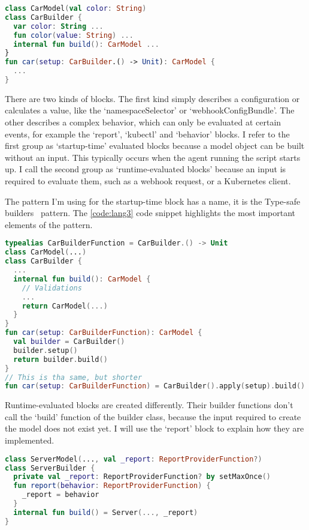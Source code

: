 \begin{minipage}{\linewidth}
\begin{lstlisting}[caption={Basic idea behind a block},language=Kotlin,label=code:lang2]
class CarModel(val color: String)
class CarBuilder {
  var color: String ...
  fun color(value: String) ...
  internal fun build(): CarModel ...
}
fun car(setup: CarBuilder.() -> Unit): CarModel {
  ...
}
\end{lstlisting}
\end{minipage}

There are two kinds of blocks. The first kind simply describes a configuration or calculates a value, like the `namespaceSelector' or `webhookConfigBundle'. The other describes a complex behavior, which can only be evaluated at certain events, for example the `report', `kubectl' and `behavior' blocks. I refer to the first group as `startup-time' evaluated blocks because a model object can be built without an input. This typically occurs when the agent running the script starts up. I call the second group as `runtime-evaluated blocks' because an input is required to evaluate them, such as a webhook request, or a Kubernetes client.

The pattern I'm using for the startup-time block has a name, it is the Type-safe builders~\cite{TypeSafeBuilders} pattern. The \ref{code:lang3} code snippet highlights the most important elements of the pattern.

\begin{minipage}{\linewidth}
\begin{lstlisting}[caption={Type-safe builders example},language=Kotlin,label=code:lang3]
typealias CarBuilderFunction = CarBuilder.() -> Unit
class CarModel(...)
class CarBuilder {
  ...
  internal fun build(): CarModel {
    // Validations
    ...
    return CarModel(...)
  }
}
fun car(setup: CarBuilderFunction): CarModel {
  val builder = CarBuilder()
  builder.setup()
  return builder.build()
}
// This is tha same, but shorter
fun car(setup: CarBuilderFunction) = CarBuilder().apply(setup).build()
\end{lstlisting}
\end{minipage}

Runtime-evaluated blocks are created differently. Their builder functions don't call the `build' function of the builder class, because the input required to create the model does not exist yet. I will use the `report' block to explain how they are implemented.

\begin{minipage}{\linewidth}
\begin{lstlisting}[caption={Builder function of the report block},language=Kotlin,label=code:runtimeblock0]
class ServerModel(..., val _report: ReportProviderFunction?)
class ServerBuilder {
  private val _report: ReportProviderFunction? by setMaxOnce()
  fun report(behavior: ReportProviderFunction) {
    _report = behavior
  }
  internal fun build() = Server(..., _report)
}
\end{lstlisting}
\end{minipage}

